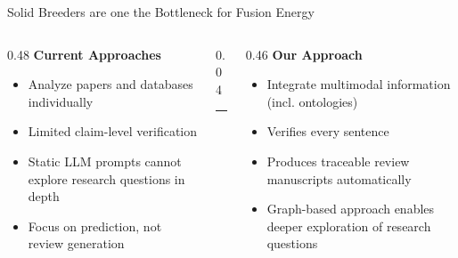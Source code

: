 \documentclass[aspectratio=169, 11pt]{beamer}
\begin{document}
\begin{frame}{Solid Breeders are one the Bottleneck for Fusion Energy}
\vspace{4pt}

\begin{columns}[T]
  \begin{column}{0.48\textwidth}
    \centering\textbf{\color{ornlgrey}Current Approaches}\\[10pt]
    \footnotesize
    \begin{itemize}\setlength\itemsep{6pt}
      \item Analyze papers and databases individually
      \item Limited claim-level verification
      \item Static LLM prompts cannot explore research questions in depth
      \item Focus on prediction, not review generation
    \end{itemize}
  \end{column}
  \begin{column}{0.04\textwidth}\centering
    \rule{0.5pt}{4cm}
  \end{column}
  \begin{column}{0.46\textwidth}
    \centering\textbf{\color{ornlgreen}Our Approach}\\[10pt]
    \footnotesize
    \begin{itemize}\setlength\itemsep{6pt}
      \item Integrate multimodal information (incl. ontologies)
      \item Verifies every sentence 
      \item Produces traceable review manuscripts automatically
      \item Graph-based approach enables deeper exploration of research questions
    \end{itemize}
  \end{column}
\end{columns}


\end{frame}
\end{document}
